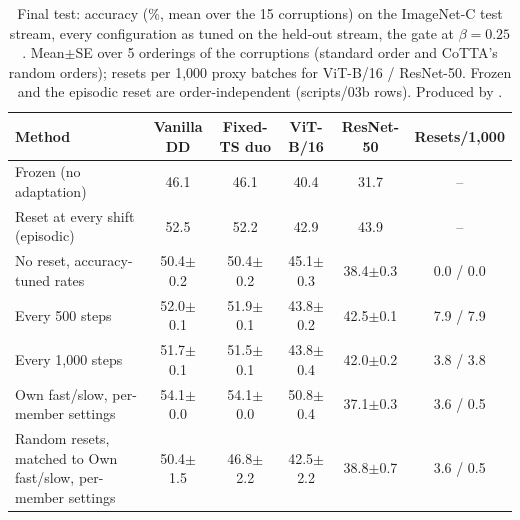 \begin{table}[t]
  \centering\small
  \begin{tabular}{@{}lccccc@{}}
    \toprule
    Method & Vanilla DD & Fixed-TS duo & ViT-B/16 & ResNet-50 & Resets/1,000 \\
    \midrule
    Frozen (no adaptation) & 46.1 & 46.1 & 40.4 & 31.7 & -- \\
    Reset at every shift (episodic) & 52.5 & 52.2 & 42.9 & 43.9 & -- \\
    \midrule
    No reset, accuracy-tuned rates & 50.4$\pm$0.2 & 50.4$\pm$0.2 & 45.1$\pm$0.3 & 38.4$\pm$0.3 & 0.0 / 0.0 \\
    \midrule
    Every 500 steps & 52.0$\pm$0.1 & 51.9$\pm$0.1 & 43.8$\pm$0.2 & 42.5$\pm$0.1 & 7.9 / 7.9 \\
    Every 1,000 steps & 51.7$\pm$0.1 & 51.5$\pm$0.1 & 43.8$\pm$0.4 & 42.0$\pm$0.2 & 3.8 / 3.8 \\
    \midrule
    Own fast/slow, per-member settings & 54.1$\pm$0.0 & 54.1$\pm$0.0 & 50.8$\pm$0.4 & 37.1$\pm$0.3 & 3.6 / 0.5 \\
    \midrule
    Random resets, matched to Own fast/slow, per-member settings & 50.4$\pm$1.5 & 46.8$\pm$2.2 & 42.5$\pm$2.2 & 38.8$\pm$0.7 & 3.6 / 0.5 \\
    \bottomrule
  \end{tabular}
  \caption{Final test: accuracy (\%, mean over the 15 corruptions) on the ImageNet-C test stream, every configuration as tuned on the held-out stream, the gate at $\beta=0.25$. Mean$\pm$SE over 5 orderings of the corruptions (standard order and CoTTA's random orders); resets per 1,000 proxy batches for ViT-B/16 / ResNet-50. Frozen and the episodic reset are order-independent (scripts/03b rows). Produced by .}
  \label{tab:final_test}
\end{table}

